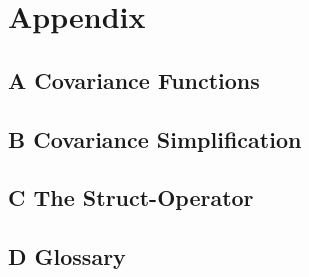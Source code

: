 \documentclass[twoside,11pt]{article}
\begin{document}
\section*{Appendix}
\subsection*{A Covariance Functions}


\subsection*{B Covariance Simplification}


\subsection*{C The Struct-Operator}


\newpage
\subsection*{D Glossary}

%

\newpage


\end{document}
